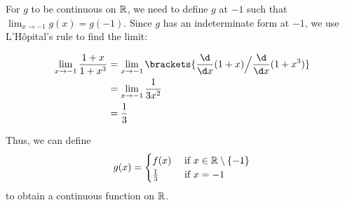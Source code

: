 \begin{problem}
\begin{enumroman}
\begin{answer}
        For $g$ to be continuous on $\mathbb{R}$, we need to define $g$
        at $-1$ such that $\displaystyle \lim_{x \to -1} g(x) = g(-1)$.
        Since $g$ has an indeterminate form at $-1$, 
        we use L'H\^{o}pital's rule to find the limit:

        \begin{align*}
          \lim_{x \to -1} \frac{1 + x}{1 + x^3}
          &= \lim_{x \to -1} \brackets{\frac{\d}{\d x} (1 + x) \Big/ \frac{\d}{\d x} (1 + x^3)} \\
          &= \lim_{x \to -1} \frac{1}{3x^2} \\
          &= \frac{1}{3}
        \end{align*}

        \step
        Thus, we can define
        \[
          g(x) = \begin{cases}
            f(x) &\text{ if } x \in \mathbb{R} \setminus \left\{-1\right\} \\
            \frac{1}{3} &\text{ if } x = -1
          \end{cases}
        \]
        to obtain a continuous function on $\mathbb{R}$.
      \end{answer}
  \end{enumroman}
\end{problem}

